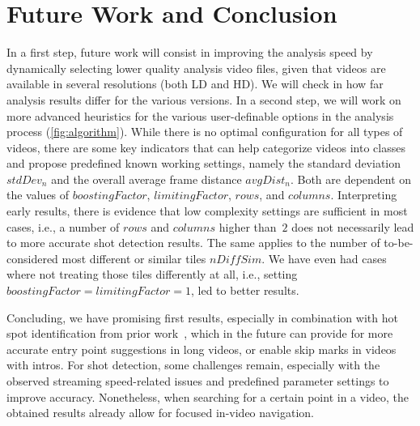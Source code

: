 \documentclass{acm_proc_article-sp}
\begin{document}
\section{Future Work and Conclusion} \label{sec:future-work-conclusion}

In a first step, future work will consist in improving the analysis speed by dynamically selecting lower quality analysis video files, given that videos are available in several resolutions (both LD and HD). We will check in how far analysis results differ for the various versions. In a second step, we will work on more advanced heuristics for the various user-definable options in the analysis process (\autoref{fig:algorithm}). While there is no optimal configuration for all types of videos, there are some key indicators that can help categorize videos into classes and propose predefined known working settings, namely the standard deviation $\mathit{stdDev_{n}}$ and the overall average frame distance $\mathit{avgDist_{n}}$. Both are dependent on the values of $\mathit{boostingFactor}$, $\mathit{limitingFactor}$, $\mathit{rows}$, and $\mathit{columns}$. Interpreting early results, there is evidence that low complexity settings are sufficient in most cases, i.e., a number of $\mathit{rows}$ and $\mathit{columns}$ higher than~$\mathit{2}$ does not necessarily lead to more accurate shot detection results. The same applies to the number of to-be-considered most different or similar tiles $\mathit{nDiffSim}$. We have even had cases where not treating those tiles differently at all, i.e., setting $\mathit{boostingFactor} = \mathit{limitingFactor} = \mathit{1}$, led to better results.

Concluding, we have promising first results, especially in combination with hot spot identification from prior work~\cite{derive2011}, which in the future can provide for more accurate entry point suggestions in long videos, or enable skip marks in videos with intros.
For shot detection, some challenges remain, especially with the observed streaming speed-related issues and predefined parameter settings to improve accuracy. Nonetheless, when searching for a certain point in a video, the obtained results already allow for focused in-video navigation.
\end{document}
